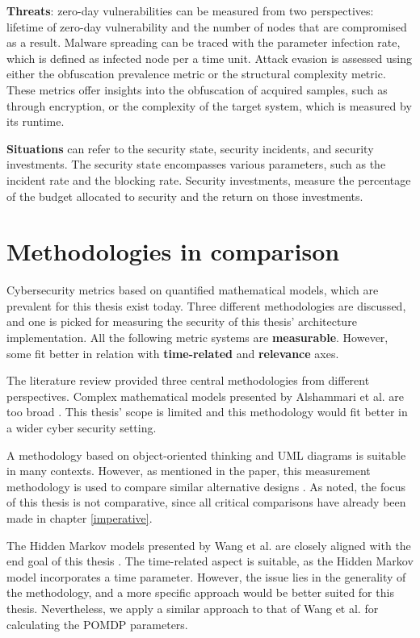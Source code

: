 \textbf{Threats}: zero-day vulnerabilities can be measured from two
perspectives: lifetime of zero-day vulnerability and the number of
nodes that are compromised as a result. Malware spreading can be
traced with the parameter infection rate, which is defined as infected
node per a time unit. Attack evasion is assessed using either the
obfuscation prevalence metric or the structural complexity
metric. These metrics offer insights into the obfuscation of acquired
samples, such as through encryption, or the complexity of the target
system, which is measured by its runtime. \cite{pendleton2016survey,  ramos2017model}

\textbf{Situations} can refer to the security state, security
incidents, and security investments. The security state encompasses
various parameters, such as the incident rate and the blocking
rate. Security investments,  measure the percentage
of the budget allocated to security and the return on those
investments. \cite{pendleton2016survey}

\section{Methodologies in comparison} \label{whyqueries}

Cybersecurity metrics based on quantified
mathematical models, which are prevalent for this thesis exist today. Three
different methodologies are discussed, and one is picked for measuring
the security of this thesis' architecture implementation. All the following metric
systems are \textbf{measurable}. However, some fit better in relation with \textbf{time-related} and \textbf{relevance} axes.

The literature review provided three central methodologies from different perspectives. Complex mathematical models
presented by Alshammari et al. are too broad
\cite{alshammari2009security}. This thesis' scope is limited and this
methodology would fit better in a wider cyber security setting.

A methodology based on object-oriented thinking and UML diagrams is
suitable in many contexts. However, as mentioned in the paper, this
measurement methodology is used to compare similar alternative designs
\cite{alshammari2009security}. As noted, the focus of this thesis is
not comparative, since all critical comparisons have already been made
in chapter \ref{imperative}.

The Hidden Markov models presented by Wang et al. are closely aligned
with the end goal of this thesis \cite{wang2010framework}. The
time-related aspect is suitable, as the Hidden Markov model
incorporates a time parameter. However, the issue lies in the
generality of the methodology, and a more specific approach would be
better suited for this thesis. Nevertheless, we apply a similar
approach to that of Wang et al. for calculating the POMDP parameters.


